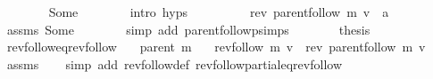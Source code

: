 \begin{isabellebody}
\ \ \ \ \ \ \isamarkupfalse%
\ Some\isanewline
\ \ \ \ \ \ \isamarkupfalse%
\ {\isacharparenleft}{\kern0pt}intro\ {\isachardoublequoteopen}{}{\isachardot}{\kern0pt}hyps{\isachardoublequoteclose}{\isacharparenright}{\kern0pt}\isanewline
\ \ \ \ \isamarkupfalse%
\ \isamarkupfalse%
\ {\isachardoublequoteopen}{\isachardot}{\kern0pt}{\isachardot}{\kern0pt}{\isachardot}{\kern0pt}\ {\isacharequal}{\kern0pt}\ rev\ {\isacharparenleft}{\kern0pt}parent{\isachardot}{\kern0pt}follow\ m\ v{\isacharparenright}{\kern0pt}\ {\isacharat}{\kern0pt}\ a{\isachardoublequoteclose}\isanewline
\ \ \ \ \ \ \isamarkupfalse%
\ assms\ Some\isanewline
\ \ \ \ \ \ \isamarkupfalse%
\ {\isacharparenleft}{\kern0pt}simp\ add{\isacharcolon}{\kern0pt}\ parent{\isachardot}{\kern0pt}follow{\isacharunderscore}{\kern0pt}psimps{\isacharparenright}{\kern0pt}\isanewline
\ \ \ \ \isamarkupfalse%
\ \isamarkupfalse%
\ {\isacharquery}{\kern0pt}thesis\isanewline
\ \ \ \ \ \ \isacommand{{\isachardot}{\kern0pt}}\isamarkupfalse%
\isanewline
\ \ \isamarkupfalse%
\isanewline
{}\isamarkupfalse%
%
\endisatagproof
{\isafoldproof}%
%
\isadelimproof
\isanewline
%
\endisadelimproof
%
\isadeliminvisible
\isanewline
%
\endisadeliminvisible
%
\isataginvisible
{}\isamarkupfalse%
\ rev{\isacharunderscore}{\kern0pt}follow{\isacharunderscore}{\kern0pt}eq{\isacharunderscore}{\kern0pt}rev{\isacharunderscore}{\kern0pt}follow{\isacharcolon}{\kern0pt}\isanewline
\ \ \ {\isachardoublequoteopen}parent\ m{\isachardoublequoteclose}\isanewline
\ \ \ {\isachardoublequoteopen}rev{\isacharunderscore}{\kern0pt}follow\ m\ v\ {\isacharequal}{\kern0pt}\ rev\ {\isacharparenleft}{\kern0pt}parent{\isachardot}{\kern0pt}follow\ m\ v{\isacharparenright}{\kern0pt}{\isachardoublequoteclose}%
\endisataginvisible
{\isafoldinvisible}%
%
\isadeliminvisible
\isanewline
%
\endisadeliminvisible
%
\isadelimproof
\ \ %
\endisadelimproof
%
\isatagproof
{}\isamarkupfalse%
\ assms\isanewline
\ \ \isamarkupfalse%
\ {\isacharparenleft}{\kern0pt}simp\ add{\isacharcolon}{\kern0pt}\ rev{\isacharunderscore}{\kern0pt}follow{\isacharunderscore}{\kern0pt}def\ rev{\isacharunderscore}{\kern0pt}follow{\isacharunderscore}{\kern0pt}partial{\isacharunderscore}{\kern0pt}eq{\isacharunderscore}{\kern0pt}rev{\isacharunderscore}{\kern0pt}follow{\isacharparenright}{\kern0pt}%
\endisatagproof
{\isafoldproof}%
%
\isadelimproof
\isanewline
%
\endisadelimproof
\isanewline
\isanewline
%
\isadeliminvisible
\isanewline
%
\endisadeliminvisible
%
\isataginvisible
{}\isamarkupfalse%
%
\endisataginvisible
{\isafoldinvisible}%
%
\isadeliminvisible
%
\endisadeliminvisible
%
\end{isabellebody}%
